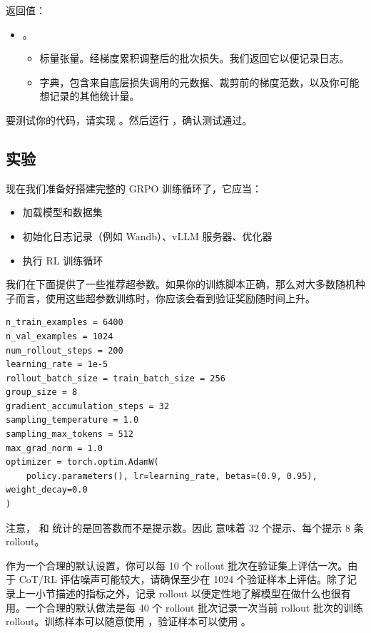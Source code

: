 返回值：

\begin{itemize}
  \item {}。
  \begin{itemize}
    \item {} 标量张量。经梯度累积调整后的批次损失。我们返回它以便记录日志。
    \item {} 字典，包含来自底层损失调用的元数据、裁剪前的梯度范数，以及你可能想记录的其他统计量。
  \end{itemize}
\end{itemize}

要测试你的代码，请实现 。然后运行 ，确认测试通过。

\subsection{实验}

现在我们准备好搭建完整的 GRPO 训练循环了，它应当：
\begin{itemize}
  \item 加载模型和数据集
  \item 初始化日志记录（例如 Wandb）、vLLM 服务器、优化器
  \item 执行 RL 训练循环
\end{itemize}

我们在下面提供了一些推荐超参数。如果你的训练脚本正确，那么对大多数随机种子而言，使用这些超参数训练时，你应该会看到验证奖励随时间上升。

\begin{lstlisting}
n_train_examples = 6400
n_val_examples = 1024
num_rollout_steps = 200
learning_rate = 1e-5
rollout_batch_size = train_batch_size = 256
group_size = 8
gradient_accumulation_steps = 32
sampling_temperature = 1.0
sampling_max_tokens = 512
max_grad_norm = 1.0
optimizer = torch.optim.AdamW(
    policy.parameters(), lr=learning_rate, betas=(0.9, 0.95), weight_decay=0.0
)
\end{lstlisting}

注意， 和  统计的是回答数而不是提示数。因此  意味着 32 个提示、每个提示 8 条 rollout。

作为一个合理的默认设置，你可以每 10 个 rollout 批次在验证集上评估一次。由于 CoT/RL 评估噪声可能较大，请确保至少在 1024 个验证样本上评估。除了记录上一小节描述的指标之外，记录 rollout 以便定性地了解模型在做什么也很有用。一个合理的默认做法是每 40 个 rollout 批次记录一次当前 rollout 批次的训练 rollout。训练样本可以随意使用 ，验证样本可以使用 。

